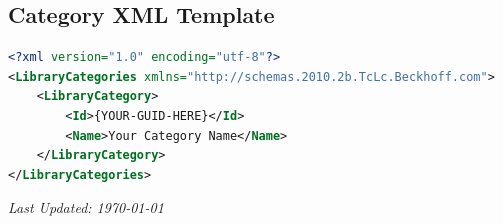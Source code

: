 \documentclass[11pt,a4paper]{article}
\begin{document}
\subsection*{Category XML Template}

\begin{lstlisting}[style=xmlstyle, language=XML]
<?xml version="1.0" encoding="utf-8"?>
<LibraryCategories xmlns="http://schemas.2010.2b.TcLc.Beckhoff.com">
    <LibraryCategory>
        <Id>{YOUR-GUID-HERE}</Id>
        <Name>Your Category Name</Name>
    </LibraryCategory>
</LibraryCategories>
\end{lstlisting}

\vfill

\begin{center}
\textit{Last Updated: \today}
\end{center}
\end{document}
